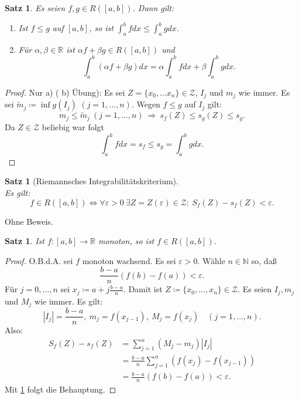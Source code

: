 \documentclass[12pt]{extreport} %
\newcommand{\N}{\mathbb{N}}
\newcommand{\R}{\mathbb{R}}
\theoremstyle{named}
\theoremstyle{itshape}
\newtheorem{satz}[unnamedtheorem]{Satz}
\theoremstyle{normal}
\begin{document}
{\begin{satz} \label{10.2:satz}
	Es seien $f, g \in R([a, b])$. Dann gilt:
	\begin{enumerate}
		\item Ist $f \leq g$ auf $[a, b]$, so ist $\int_{a}^{b} f dx \leq \int_{a}^{b} g dx$.
		\item Für $\alpha, \beta \in \R$ ist $\alpha f + \beta g \in R([a, b])$ und
			$$ \int_{a}^{b} (\alpha f + \beta g) dx = \alpha \int_{a}^{b} f dx + \beta \int_{a}^{b} g dx. $$
	\end{enumerate}
\end{satz}

\begin{proof}
	Nur a) ( b) Übung): Es sei $Z = \{ x_{0}, \dotsc x_{n} \} \in \mathcal{Z}$, $I_{j}$ und $m_{j}$ wie immer. 
	        Es sei $\tilde{m}_{j} \coloneqq \inf g(I_{j})$ $(j = 1, \dotsc, n)$. Wegen $f \leq g$ auf $I_{j}$ gilt:
		$$ m_{j} \leq \tilde{m}_{j} ~ (j = 1, \dotsc, n) ~ \Rightarrow ~ s_{f}(Z) \leq s_{g}(Z) \leq s_{g}. $$ 
		Da $Z\in \mathcal{Z}$ beliebig war folgt 
		$$ \int_{a}^{b} f dx = s_{f} \leq s_g= \int_{a}^{b} g dx. $$
\end{proof}

\begin{satz}[Riemannsches Integrabilitätskriterium] \label{10.3:prop} ~\\
Es gilt: $$f \in R([a, b]) \iff \forall \varepsilon > 0 ~\exists Z = Z(\varepsilon) \in \mathcal{Z}: ~ S_{f}(Z) - s_{f}(Z) < \varepsilon. $$	
\end{satz}

Ohne Beweis.

\begin{satz} \label{10.4:satz}
	Ist $f:[a,b] \to \R$ monoton, so ist $f \in R([a, b])$.
\end{satz}

\begin{proof}
	O.B.d.A. sei $f$ monoton wachsend. Es sei $\varepsilon > 0$. Wähle $n \in \N$ so, da{\ss} 
	$$ \frac{b - a}{n} (f(b) - f(a)) < \varepsilon. $$
	Für $j = 0, \dotsc, n$ sei $x_{j} \coloneqq a + j \frac{b - a}{n}$. Damit ist $Z \coloneqq \{ x_{0}, \dotsc, x_{n} \} \in \mathcal{Z}$. Es seien $I_{j}, m_{j}$ und $M_{j}$ 
	wie immer. Es gilt: 
	$$
	|I_{j}| = \frac{b - a}{n}, ~ m_{j} = f(x_{j-1}), ~ M_{j} = f(x_{j}) \quad (j=1,\dotsc,n).
	$$
	Also:  
	\begin{align*}
		S_{f}(Z) - s_{f}(Z) & = \sum_{j=1}^{n} (M_{j} - m_{j})|I_{j}| \\
		& = \frac{b - a}{n} \sum_{j=1}^{n} ( f(x_{j}) - f(x_{j-1}) ) \\
		& = \frac{b - a}{n} ( f(b) - f(a) ) < \varepsilon.
	\end{align*} 
	Mit \ref{10.3:prop} folgt die Behauptung.
\end{proof}


}
\end{document}
